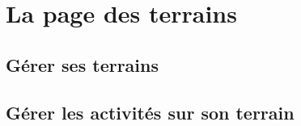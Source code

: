 \section{La page des terrains}

\subsection{Gérer ses terrains}

\subsection{Gérer les activités sur son terrain}
